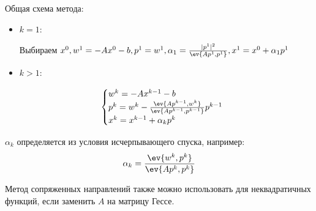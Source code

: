Общая схема метода:
\begin{itemize}
    \item \(k = 1\):

          Выбираем \(x^0, w^1 = - Ax^0 - b, p^1 = w^1, \alpha_1 = \frac{|p^1|^2}{\ev{Ap^1, p^1}}, x^1 = x^0 + \alpha_1 p^1\)

    \item \(k > 1\):

          \begin{equation}
              \begin{cases}
                  w^k = - Ax^{k - 1} - b                                                         \\
                  p^k = w^k - \frac{\ev{Ap^{k - 1}, w^k}}{\ev{A p^{k - 1}, p^{k - 1}}} p^{k - 1} \\
                  x^k = x^{k - 1} + \alpha_k p^k
              \end{cases}
              \label{fdsa}
          \end{equation}
\end{itemize}

\(\alpha_k\) определяется из условия исчерпывающего спуска, например:
\[\alpha_k = \frac{\ev{w^k, p^k}}{\ev{Ap^k, p^k}}\]

Метод сопряженных направлений также можно использовать для неквадратичных функций, если заменить \(A\) на матрицу Гессе.


\unfinished